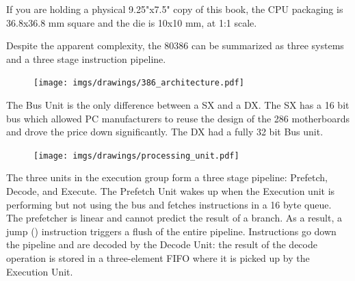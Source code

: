 \documentclass[book.tex]{subfiles}
\begin{document}
 \pagebreak
 


\par {}
If you are holding a physical 9.25"x7.5" copy of this book, the CPU packaging is 36.8x36.8 mm square and the die is 10x10 mm, at 1:1 scale.\\
\par Despite the apparent complexity, the 80386 can be summarized as three systems and a three stage instruction pipeline.


\begin{figure}[H]
\centering
\texttt{[image: imgs/drawings/386\_architecture.pdf]}
\end{figure}
\par
The Bus Unit is the only difference between a SX and a DX. The SX has a 16 bit bus which allowed PC manufacturers to reuse the design of the 286 motherboards and drove the price down significantly. The DX had a fully 32 bit Bus unit.
\par
\begin{figure}[H]
\centering
\texttt{[image: imgs/drawings/processing\_unit.pdf]}
\end{figure}
\par
The three units in the execution group form a three stage pipeline: Prefetch, Decode, and Execute. The Prefetch Unit wakes up when the Execution unit is performing but not using the bus and fetches instructions in a 16 byte queue. The prefetcher is linear and cannot predict the result of a branch. As a result, a jump () instruction triggers a flush of the entire pipeline. Instructions go down the pipeline and are decoded by the Decode Unit: the result of the decode operation is stored in a three-element FIFO where it is picked up by the Execution Unit.\\
\par
\end{document}
